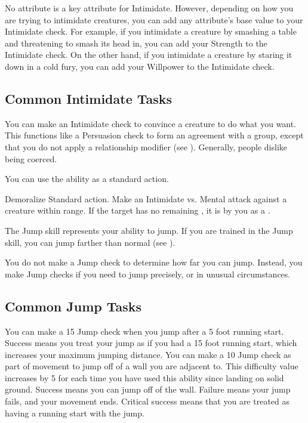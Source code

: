         No attribute is a key attribute for Intimidate.
        However, depending on how you are trying to intimidate creatures, you can add any attribute's base value to your Intimidate check.
        For example, if you intimidate a creature by smashing a table and threatening to smash its head in, you can add your Strength to the Intimidate check.
        On the other hand, if you intimidate a creature by staring it down in a cold fury, you can add your Willpower to the Intimidate check.

    \subsection{Common Intimidate Tasks}
         You can make an Intimidate check to convince a creature to do what you want. This functions like a Persuasion check to form an agreement with a group, except that you do not apply a relationship modifier (see ).
        Generally, people dislike being coerced.

         You can use the  ability as a standard action.
        \begin{activeability}{Demoralize}
            \abilityusagetime Standard action.
            \rankline
            Make an Intimidate vs. Mental attack against a creature within \rngmed range.
            \hit If the target has no remaining , it is \frightened by you as a .
        \end{activeability}

\newpage
{}
    The Jump skill represents your ability to jump.
    If you are trained in the Jump skill, you can jump farther than normal (see ).

    You do not make a Jump check to determine how far you can jump.
    Instead, you make Jump checks if you need to jump precisely, or in unusual circumstances.

    \subsection{Common Jump Tasks}
         You can make a  15 Jump check when you jump after a 5 foot running start.
        Success means you treat your jump as if you had a 15 foot running start, which increases your maximum jumping distance.
         You can make a  10 Jump check as part of movement to jump off of a wall you are adjacent to.
        This difficulty value increases by 5 for each time you have used this ability since landing on solid ground.
        Success means you can jump off of the wall.
        Failure means your jump fails, and your movement ends.
        Critical success means that you are treated as having a running start with the jump.

